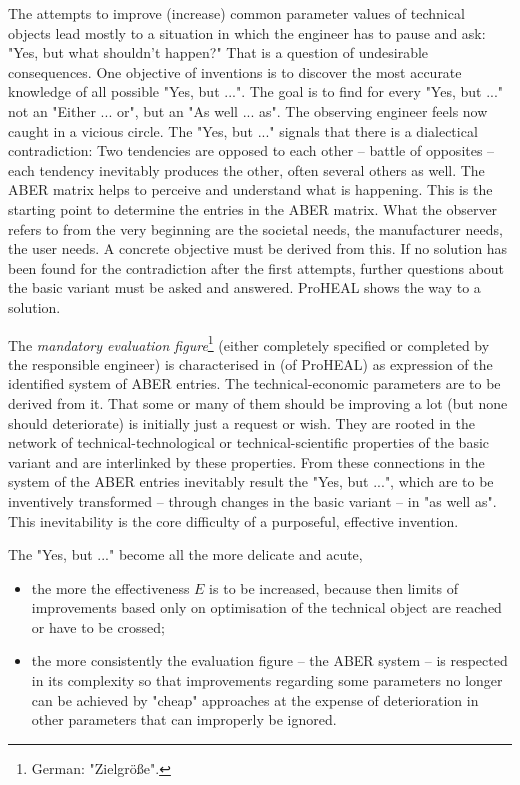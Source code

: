 \documentclass[11pt,a4paper]{article}
\begin{document}
The attempts to improve (increase) common parameter values of technical
objects lead mostly to a situation in which the engineer has to pause and ask:
"Yes, but what shouldn't happen?" That is a question of undesirable
consequences. One objective of inventions is to discover the most accurate
knowledge of all possible "Yes, but ...".  The goal is to find for every "Yes,
but ..."  not an "Either ... or", but an "As well ... as". The observing
engineer feels now caught in a vicious circle. The "Yes, but ..."  signals
that there is a dialectical contradiction: Two tendencies are opposed to each
other -- battle of opposites -- each tendency inevitably produces the other,
often several others as well. The ABER matrix helps to perceive and understand
what is happening. This is the starting point to determine the entries in the
ABER matrix. What the observer refers to from the very beginning are the
societal needs, the manufacturer needs, the user needs. A concrete objective
must be derived from this. If no solution has been found for the contradiction
after the first attempts, further questions about the basic variant must be
asked and answered. ProHEAL shows the way to a solution.

The \emph{mandatory evaluation figure}\footnote{German: "Zielgröße".} (either
completely specified or completed by the responsible engineer) is
characterised in \cite[(1.3)]{RM-21} (of ProHEAL) as expression of the
identified system of ABER entries. The technical-economic parameters are to be
derived from it. That some or many of them should be improving a lot (but none
should deteriorate) is initially just a request or wish. They are rooted in
the network of technical-technological or technical-scientific properties of
the basic variant and are interlinked by these properties. From these
connections in the system of the ABER entries inevitably result the "Yes, but
...", which are to be inventively transformed -- through changes in the basic
variant -- in "as well as". This inevitability is the core difficulty of a
purposeful, effective invention.

The "Yes, but ..." become all the more delicate and acute, 
\begin{itemize}
\item the more the effectiveness $E$ is to be increased, because then limits
  of improvements based only on optimisation of the technical object are
  reached or have to be crossed;
\item the more consistently the evaluation figure -- the ABER system -- is
  respected in its complexity so that improvements regarding some parameters
  no longer can be achieved by "cheap" approaches at the expense of
  deterioration in other parameters that can improperly be ignored.
\end{itemize}
\end{document}

